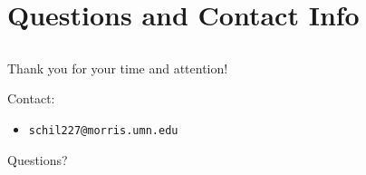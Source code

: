 \documentclass{beamer}
\newcommand{\linespace}{\vskip 0.25cm}
\begin{document}
\section*{Questions and Contact Info}
\subsection*{}
\begin{frame}
	
	Thank you for your time and attention!
		
	\linespace
	\linespace
	
	Contact:  
	\begin{itemize}
		\item \texttt{schil227@morris.umn.edu}
	\end{itemize}
	
	\linespace
	\linespace
	
	\begin{center}
	{\huge Questions?}
	\end{center}
\end{frame}
\end{document}
